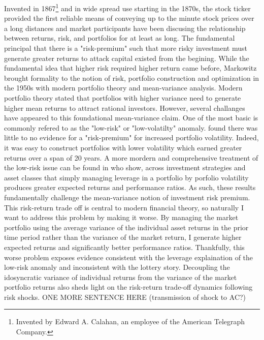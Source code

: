\noindent Invented in 1867\footnote{Invented by Edward A. Calahan, an employee of the American Telegraph Company.} and in wide spread use starting in the 1870s, the stock ticker provided the first reliable means of conveying up to the minute stock prices over a long distances and market participants have been discusing the relationship between returns, risk, and portfolios for at least as long.\citep{rutterford_financial_2016} The fundamental principal that there is a "risk-premium" such that more risky investment must generate greater returns to attack capital existed from the begining. While the fundamental idea that higher risk required higher return came before, Markowitz brought formality to the notion of risk, portfolio construction and optimization in the 1950s with modern portfolio theory and mean-variance analysis. Modern portfolio theory stated that portfolios with higher variance need to generate higher mean returns to attract rational investors.\citep{markowitz_portfolio_1952} However, several challanges have appeared to this foundational mean-variance claim. One of the most basic is commonly refered to as the "low-risk" or "low-volatilty" anomaly. \citet{haugen_1972} found there was little to no evidence for a "risk-premium" for increased portfolio volatility. Indeed, it was easy to construct portfolios with lower volatility which earned greater returns over a span of 20 years. A more mordern and comprehensive treatment of the low-risk issue can be found in \citet{moreira_volatility-managed_2017} who show, across investment strategies and asset classes that simply managing leverage in a portfolio by porfolio volatility produces greater expected returns and performance ratios. As such, these results fundamentally challenge the mean-variance notion of investment risk premium. This risk-return trade off is central to modern financial theory, so naturally I want to address this problem by making it worse. By managing the market portfolio using the average variance of the individual asset returns in the prior time period rather than the variance of the market return, I generate higher expected returns and significantly better performance ratios. Thankfully, this worse problem exposes evidence consistent with the leverage explaination of the low-risk anomaly and inconsistent with the lottery story. Decoupling the idosyncratic variance of individual returns from the variance of the market portfolio returns also sheds light on the risk-return trade-off dynamics following risk shocks. ONE MORE SENTENCE HERE (transmission of shock to AC?)

